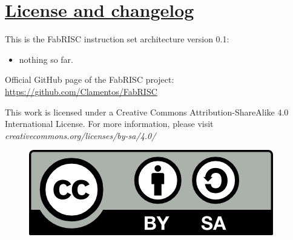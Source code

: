 \section[License and changelog]{\LARGE\underline{License and changelog}}

    This is the FabRISC instruction set architecture version 0.1:

    \begin{itemize}

        \item nothing so far.

    \end{itemize}

    \vspace{10pt}

    Official GitHub page of the FabRISC project: \url{https://github.com/Clamentos/FabRISC}

    \vspace{10pt}

    This work is licensed under a Creative Commons Attribution-ShareAlike 4.0 International License. For more information, please visit \textit{creativecommons.org/licenses/by-sa/4.0/}

    \begin{figure}[hbt!]

        \includegraphics[scale = 0.8]{./Images/LICENSE.png}
        \label{fig:LICENSE}
        
    \end{figure}